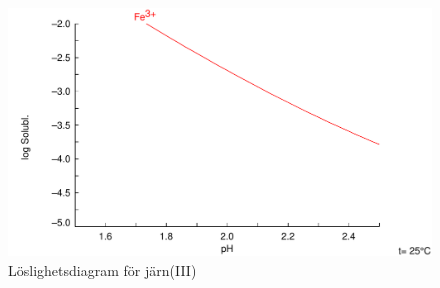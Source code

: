 \begin{figure}
  \centering
  \includegraphics[scale=0.4]{fig/fe.pdf}
  \caption{Löslighetsdiagram för järn(III)}
  \label{fig:fe}
\end{figure}

